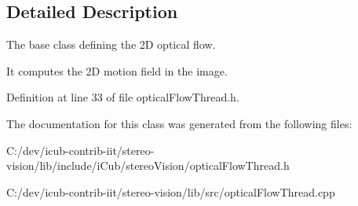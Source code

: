 \subsection{Detailed Description}
The base class defining the 2D optical flow. 

It computes the 2D motion field in the image. 

Definition at line 33 of file optical\+Flow\+Thread.\+h.



The documentation for this class was generated from the following files\+:\begin{DoxyCompactItemize}
\item 
C\+:/dev/icub-\/contrib-\/iit/stereo-\/vision/lib/include/i\+Cub/stereo\+Vision/optical\+Flow\+Thread.\+h\item 
C\+:/dev/icub-\/contrib-\/iit/stereo-\/vision/lib/src/optical\+Flow\+Thread.\+cpp\end{DoxyCompactItemize}
